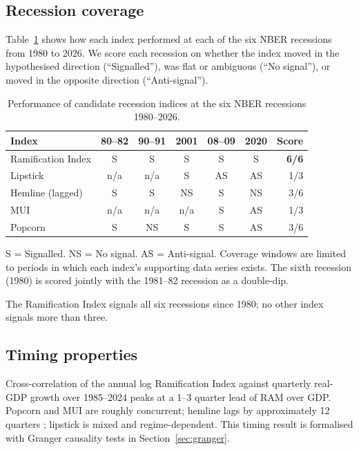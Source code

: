 \documentclass[12pt]{article}
\theoremstyle{definition}
\begin{document}
\subsection{Recession coverage}

Table~\ref{tab:recession} shows how each index performed at each of the six NBER recessions from 1980 to 2026. We score each recession on whether the index moved in the hypothesised direction (``Signalled''), was flat or ambiguous (``No signal''), or moved in the opposite direction (``Anti-signal'').

\begin{table}[H]
\centering
\caption{Performance of candidate recession indices at the six NBER recessions 1980--2026.}
\label{tab:recession}
\begin{tabular}{lcccccr}
\toprule
\textbf{Index} & \textbf{80--82} & \textbf{90--91} & \textbf{2001} & \textbf{08--09} & \textbf{2020} & \textbf{Score} \\
\midrule
Ramification Index & S & S & S & S & S & \textbf{6/6} \\
Lipstick & n/a & n/a & S & AS & AS & 1/3 \\
Hemline (lagged) & S & S & NS & S & NS & 3/6 \\
MUI & n/a & n/a & n/a & S & AS & 1/3 \\
Popcorn & S & NS & S & S & AS & 3/6 \\
\bottomrule
\end{tabular}
\medskip

\footnotesize S = Signalled. NS = No signal. AS = Anti-signal. Coverage windows are limited to periods in which each index's supporting data series exists. The sixth recession (1980) is scored jointly with the 1981--82 recession as a double-dip.
\end{table}

The Ramification Index signals all six recessions since 1980; no other index signals more than three.

\subsection{Timing properties}

Cross-correlation of the annual log Ramification Index against quarterly real-GDP growth over 1985--2024 peaks at a 1--3 quarter lead of RAM over GDP. Popcorn and MUI are roughly concurrent; hemline lags by approximately 12 quarters \cite{vanBaardwijk2010}; lipstick is mixed and regime-dependent. This timing result is formalised with Granger causality tests in Section~\ref{sec:granger}.
\end{document}
